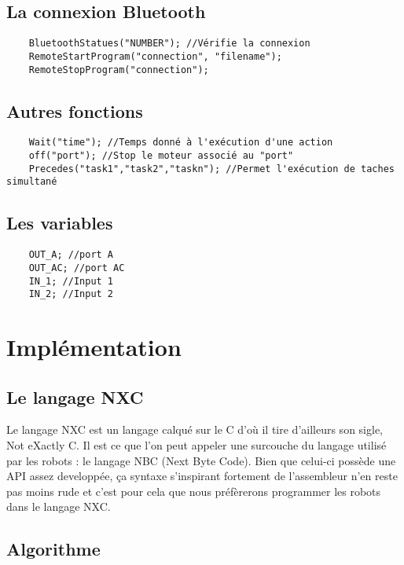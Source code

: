 \subsection{La connexion Bluetooth }
\begin{verbatim}
	BluetoothStatues("NUMBER"); //Vérifie la connexion
	RemoteStartProgram("connection", "filename");
	RemoteStopProgram("connection");

\end{verbatim}

\subsection{Autres fonctions }
\begin{verbatim}
	Wait("time"); //Temps donné à l'exécution d'une action
	off("port"); //Stop le moteur associé au "port"
	Precedes("task1","task2","taskn"); //Permet l'exécution de taches simultané

\end{verbatim}

\subsection{Les variables }
\begin{verbatim}
	OUT_A; //port A
	OUT_AC; //port AC
	IN_1; //Input 1
	IN_2; //Input 2

\end{verbatim}

\section{Implémentation}

\subsection{Le langage NXC}

Le langage NXC est un langage calqué sur le C d'où il tire d'ailleurs son
sigle, Not eXactly C. Il est ce que l'on peut appeler une surcouche du
langage utilisé par les robots  : le langage NBC (Next Byte Code). Bien
que celui-ci possède une API assez developpée, ça syntaxe s'inspirant
fortement de l'assembleur n'en reste pas moins rude et c'est pour cela
que nous préfèrerons programmer les robots  dans le langage NXC.


\subsection{Algorithme}


